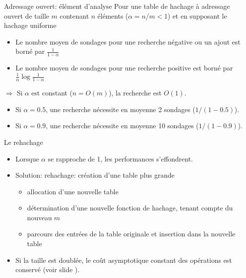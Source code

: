 \begin{frame}{Adressage ouvert: élément d'analyse}
Pour une table de hachage à adressage ouvert de taille $m$ contenant $n$ éléments ($\alpha=n/m<1$) et en supposant le hachage uniforme
\begin{itemize}
\item Le nombre moyen de sondages pour une recherche négative ou un
  ajout est borné par $\frac{1}{1-\alpha}$
\item Le nombre moyen de sondages pour une recherche positive est borné par $\frac{1}{\alpha} \log \frac{1}{1-\alpha}$
\end{itemize}

\bigskip

$\Rightarrow$ Si $\alpha$ est constant ($n=O(m)$), la recherche est $O(1)$.
\begin{itemize}
\item Si $\alpha=0.5$, une recherche nécessite en moyenne 2 sondages ($1/(1-0.5)$).
\item Si $\alpha=0.9$, une recherche nécessite en moyenne 10 sondages ($1/(1-0.9)$).
\end{itemize}

\end{frame}

\begin{frame}{Le rehachage}
\begin{itemize}
\item Lorsque $\alpha$ se rapproche de 1, les performances s'effondrent.
\item Solution: rehachage: création d'une table plus grande
\begin{itemize}
\item allocation d'une nouvelle table
\item détermination d'une nouvelle fonction de hachage, tenant compte du nouveau $m$
\item parcours des entrées de la table originale et insertion dans la nouvelle table
\end{itemize}
\item Si la taille est doublée, le coût asymptotique constant des opérations est conservé (voir slide \pageref{sec05:amortie}).
\end{itemize}

\end{frame}

